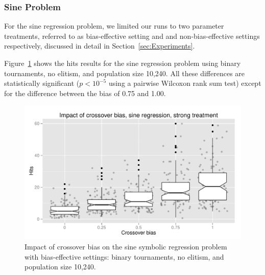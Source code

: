 \documentclass{sig-alternate}
\begin{document}
\subsubsection{Sine Problem}

For the sine regression problem, we limited our runs to two parameter treatments, referred to as bias-effective setting
and and non-bias-effective settings respectively, discussed in detail in Section~\ref{sec:Experiments}.

Figure~\ref{fig:sineBiasResultsStrong} shows the hits results for the sine regression problem using binary tournaments,
no elitism, and population size 10,240. All these differences are statistically significant ($p < 10^{-5}$ using a
pairwise Wilcoxon rank sum test) except for the difference between the bias of 0.75 and 1.00.

\begin{figure}
\centering
\includegraphics[width=0.45 \textwidth]{Plots/Sine_XO_impact_strong_boxplot.pdf}
\caption{Impact of crossover bias on the sine symbolic regression problem with bias-effective settings: binary
tournaments, no elitism, and population size 10,240.}
\label{fig:sineBiasResultsStrong}
\end{figure}

%
%
%
%

%
%
%
%
\end{document}
